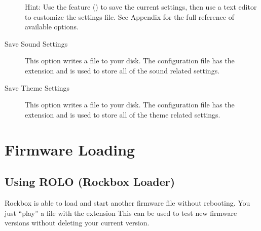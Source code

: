 \begin{description}
  Hint: Use the  feature () to save the current settings, then
  use a text editor to customize the settings file. See Appendix
   for the full reference of available
  options.

\item [Save Sound Settings]This option writes a  file to
  your \daps{} disk. The configuration file has the 
  extension and is used to store all of the sound related settings.

\item [Save Theme Settings]This option writes a  file to
  your \daps{} disk. The configuration file has the 
  extension and is used to store all of the theme related settings.

\end{description}

\section{\label{ref:FirmwareLoading}Firmware Loading}

\subsection{\label{ref:using_rolo}Using ROLO (Rockbox Loader)}
Rockbox is able to load and start another firmware file without rebooting.
You just ``play'' a file with the extension %
This can be used to test new firmware versions without deleting your
current version.

